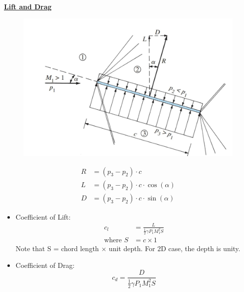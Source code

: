 \large \textbf{\underline{{\color{red}Lift and Drag}}}
\begin{figure}[H]
    \centering
    \includegraphics[width=1.0\linewidth]{images/Compressible_Aerodynamics.png}
\end{figure}

\begin{align*}
    R &= (p_3 - p_2 ) \cdot c \\
    L &= (p_3 - p_2 ) \cdot c \cdot \cos(\alpha) \\
    D &= (p_3 - p_2 ) \cdot c \cdot \sin(\alpha)
\end{align*}

\begin{itemize}
    \item Coefficient of Lift:
    \begin{align*}
        c_l &= \frac{L}{\frac{1}{2}\gamma P_1 M_1^2 S} \\
        \text{where } S &= c \times 1
    \end{align*}
    Note that S = chord length $\times$ unit depth. For 2D case, the depth is unity.
    \item Coefficient of Drag:
    \begin{equation*}
        c_d = \frac{D}{\frac{1}{2}\gamma P_1 M_1^2 S}
    \end{equation*}
\end{itemize}